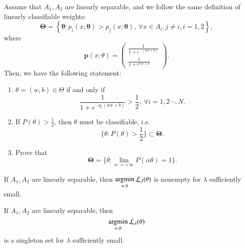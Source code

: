 \begin{lemma}
Assume that $A_1,A_2$ are linearly separable, and we follow the same definition
of linearly classifiable weights:
\begin{equation}
\bm{\Theta} = \left\{\bm\theta: p_i(x; \bm\theta)>p_j(x; \bm\theta),~\forall x\in A_i, j\neq i, i= 1,2\right\},
\end{equation}
where 
\begin{equation}\label{key}
\bm p(x;\theta) = \begin{pmatrix} 
\frac{1}{1+ e^{-(wx+b)}}\\
\frac{1}{1+e^{wx+b}}
\end{pmatrix}.
\end{equation}
Then, we have the following statement:\\

\begin{enumerate}

\item  $\theta = (w,b) \in \Theta$ if and only if
		\begin{equation*}
		\frac{1}{1+ e^{-y_i(wx+b)}} > \frac{1}{2},\ \forall i = 1,2\cdots,N.
		\end{equation*} 
\item  If $P(\theta) > \frac{1}{2}$, then $\theta$ must be classifiable, i.e.
\begin{equation*}
	\{\theta: P(\theta)>\frac{1}{2}\}\subset \bm \Theta.
\end{equation*}
\item  Prove that
\begin{equation*}
	\bm\Theta = \{\theta: \lim_{\alpha\rightarrow +\infty} P(\alpha \theta) = 1\}.
\end{equation*}
\end{enumerate}
\end{lemma}

 
 
	If $A_1,A_2$ are linearly separable, then
$\displaystyle 
\mathop{\rm argmin}_{w,b} \mathcal L_{\lambda}(\theta)
$
	is nonempty for $\lambda $ sufficiently small.


\begin{lemma}
		If $A_1,A_2$ are linearly separable, then
	\begin{equation}\label{binaryLR}
	\mathop{\rm argmin}_{w,b} \mathcal L_{\lambda}(\theta)
	\end{equation}
	is a singleton set for $\lambda $ sufficiently small.
\end{lemma}

